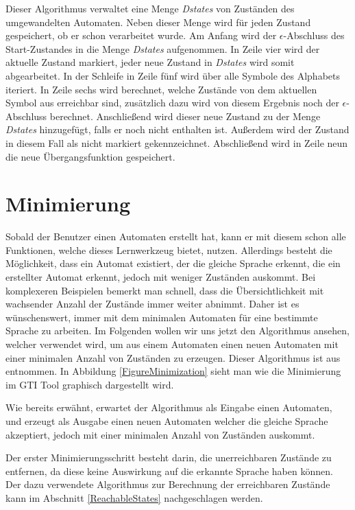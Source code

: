 Dieser Algorithmus verwaltet eine Menge \textit{Dstates} von Zuständen des
umgewandelten Automaten. Neben dieser Menge wird für jeden Zustand gespeichert,
ob er schon verarbeitet wurde. Am Anfang wird der $\epsilon$-Abschluss des
Start-Zustandes  in die Menge \textit{Dstates} aufgenommen. In Zeile
vier wird der aktuelle Zustand markiert, jeder neue Zustand in \textit{Dstates}
wird somit abgearbeitet. In der Schleife in Zeile fünf wird über alle Symbole des
Alphabets iteriert. In Zeile sechs wird berechnet, welche Zustände von dem
aktuellen Symbol aus erreichbar sind, zusätzlich dazu wird von diesem Ergebnis
noch der $\epsilon$-Abschluss berechnet. Anschließend wird dieser neue Zustand zu
der Menge \textit{Dstates} hinzugefügt, falls er noch nicht enthalten ist.
Außerdem wird der Zustand in diesem Fall als nicht markiert gekennzeichnet.
Abschließend wird in Zeile neun die neue Übergangsfunktion
gespeichert.\vspace{10pt}


\section{Minimierung}\label{Minimize}

Sobald der Benutzer einen Automaten erstellt hat, kann er mit diesem schon alle
Funktionen, welche dieses Lernwerkzeug bietet, nutzen. Allerdings besteht die
Möglichkeit, dass ein Automat existiert, der die gleiche Sprache erkennt, die ein
erstellter Automat erkennt, jedoch mit weniger Zuständen auskommt. Bei
komplexeren Beispielen bemerkt man schnell, dass die Übersichtlichkeit mit
wachsender Anzahl der Zustände immer weiter abnimmt. Daher ist es wünschenswert,
immer mit dem minimalen Automaten für eine bestimmte Sprache zu arbeiten. Im
Folgenden wollen wir uns jetzt den Algorithmus ansehen, welcher verwendet wird,
um aus einem Automaten einen neuen Automaten mit einer minimalen Anzahl von
Zuständen zu erzeugen. Dieser Algorithmus ist aus \cite{Compilers}
entnommen. In Abbildung \ref{FigureMinimization} sieht man wie die
Minimierung im GTI Tool graphisch dargestellt wird.\vspace{10pt}

Wie bereits erwähnt, erwartet der Algorithmus als Eingabe einen Automaten, und
erzeugt als Ausgabe einen neuen Automaten welcher die gleiche Sprache
akzeptiert, jedoch mit einer minimalen Anzahl von Zuständen
auskommt.\vspace{10pt}

Der erster Minimierungsschritt besteht darin, die unerreichbaren Zustände zu
entfernen, da diese keine Auswirkung auf die erkannte Sprache haben können. Der
dazu verwendete Algorithmus zur Berechnung der erreichbaren Zustände kann im
Abschnitt \ref{ReachableStates} nachgeschlagen werden.\vspace{10pt}

